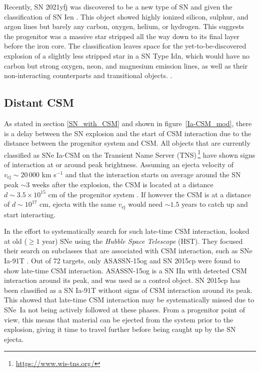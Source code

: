 \documentclass[a4paper,oneside,12pt, class=Latex/Classes/PhDthesisPSnPDF, crop=false]{standalone}
\begin{document}
Recently, SN 2021yfj was discovered to be a new type of SN and given the classification of SN Ien \citep{Ien_class}. This object showed highly ionized silicon, sulphur, and argon lines but barely any carbon, oxygen, helium, or hydrogen. This suggests the progenitor was a massive star stripped all the way down to its final layer before the iron core. The classification leaves space for the yet-to-be-discovered explosion of a slightly less stripped star in a SN Type Idn, which would have no carbon but strong oxygen, neon, and magnesium emission lines, as well as their non-interacting counterparts and transitional objects. \citep{Ien_disc}.


\subsection{Distant CSM}
As stated in section \ref{SN_with_CSM} and shown in figure~\ref{Ia-CSM_mod}, there is a delay between the SN explosion and the start of CSM interaction due to the distance between the progenitor system and CSM. All objects that are currently classified as SNe Ia-CSM on the Transient Name Server (TNS)\,\footnote{\url{https://www.wis-tns.org/}} have shown signs of interaction at or around peak brightness. Assuming an ejecta velocity of $v_\text{ej} \sim 20\,000$ km s$^{-1}$ and that the interaction starts on average around the SN peak $\sim3$ weeks after the explosion, the CSM is located at a distance $d\sim3.5\times10^{15}$ cm of the progenitor system \citep{Ia-CSM_BTS}. If however the CSM is at a distance of $d\sim10^{17}$ cm, ejecta with the same $v_\text{ej}$ would need $\sim1.5$ years to catch up and start interacting.

In the effort to systematically search for such late-time CSM interaction, \citet{2015cp} looked at old ($\geq1$ year) SNe using the \textit{Hubble Space Telescope} (HST). They focused their search on subclasses that are associated with CSM interaction, such as SNe Ia-91T \citep{Ia-CSM_and_91T_connection}. Out of 72 targets, only ASASSN-15og and SN 2015cp were found to show late-time CSM interaction. ASASSN-15og is a SN IIn with detected CSM interaction around its peak, and was used as a control object. SN 2015cp has been classified as a SN Ia-91T without signs of CSM interaction around its peak. This showed that late-time CSM interaction may be systematically missed due to SNe~Ia not being actively followed at these phases. From a progenitor point of view, this means that material can be ejected from the system prior to the explosion, giving it time to travel further before being caught up by the SN ejecta.
\end{document}
